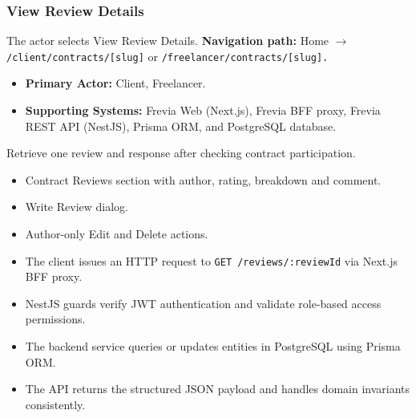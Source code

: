 \subsubsection{View Review Details}

The actor selects View Review Details.\newline
\textbf{Navigation path:} Home $\rightarrow$ \texttt{/\allowbreak{}client/\allowbreak{}contracts/\allowbreak{}[slug]} or \texttt{/\allowbreak{}freelancer/\allowbreak{}contracts/\allowbreak{}[slug].}


\begin{itemize}[leftmargin=1.6em,topsep=3pt,itemsep=2pt,parsep=0pt,label=$\bullet$]
    \item \textbf{Primary Actor:} Client, Freelancer.
    \item \textbf{Supporting Systems:} Frevia Web (Next.js), Frevia BFF proxy, Frevia REST API (NestJS), Prisma ORM, and PostgreSQL database.
\end{itemize}

\noindent Retrieve one review and response after checking contract participation.

\begin{itemize}[leftmargin=1.6em,topsep=3pt,itemsep=2pt,parsep=0pt,label=$\bullet$]
    \item Contract Reviews section with author, rating, breakdown and comment.
    \item Write Review dialog.
    \item Author-only Edit and Delete actions.
\end{itemize}

\begin{itemize}[leftmargin=1.6em,topsep=3pt,itemsep=2pt,parsep=0pt,label=$\bullet$]
    \item The client issues an HTTP request to \texttt{GET /\allowbreak{}reviews/\allowbreak{}:\allowbreak{}reviewId} via Next.js BFF proxy.
    \item NestJS guards verify JWT authentication and validate role-based access permissions.
    \item The backend service queries or updates entities in PostgreSQL using Prisma ORM.
    \item The API returns the structured JSON payload and handles domain invariants consistently.
\end{itemize}

